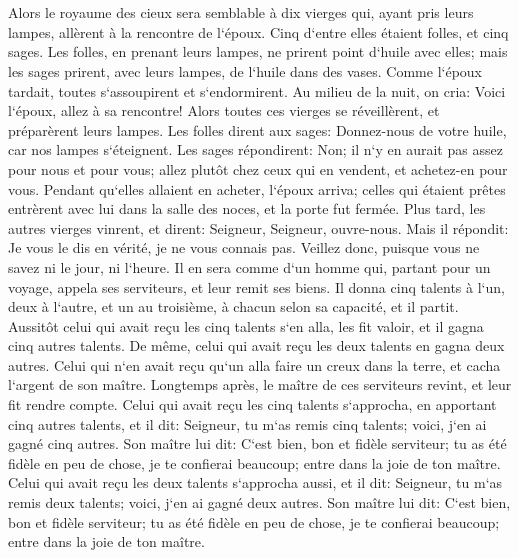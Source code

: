 \chapter{}

\verse Alors le royaume des cieux sera semblable à dix vierges qui, ayant pris leurs lampes, allèrent à la rencontre de l`époux. 
\verse Cinq d`entre elles étaient folles, et cinq sages. 
\verse Les folles, en prenant leurs lampes, ne prirent point d`huile avec elles; 
\verse mais les sages prirent, avec leurs lampes, de l`huile dans des vases. 
\verse Comme l`époux tardait, toutes s`assoupirent et s`endormirent. 
\verse Au milieu de la nuit, on cria: Voici l`époux, allez à sa rencontre! 
\verse Alors toutes ces vierges se réveillèrent, et préparèrent leurs lampes. 
\verse Les folles dirent aux sages: Donnez-nous de votre huile, car nos lampes s`éteignent. 
\verse Les sages répondirent: Non; il n`y en aurait pas assez pour nous et pour vous; allez plutôt chez ceux qui en vendent, et achetez-en pour vous. 
\verse Pendant qu`elles allaient en acheter, l`époux arriva; celles qui étaient prêtes entrèrent avec lui dans la salle des noces, et la porte fut fermée. 
\verse Plus tard, les autres vierges vinrent, et dirent: Seigneur, Seigneur, ouvre-nous. 
\verse Mais il répondit: Je vous le dis en vérité, je ne vous connais pas. 
\verse Veillez donc, puisque vous ne savez ni le jour, ni l`heure. 
\verse Il en sera comme d`un homme qui, partant pour un voyage, appela ses serviteurs, et leur remit ses biens. 
\verse Il donna cinq talents à l`un, deux à l`autre, et un au troisième, à chacun selon sa capacité, et il partit. 
\verse Aussitôt celui qui avait reçu les cinq talents s`en alla, les fit valoir, et il gagna cinq autres talents. 
\verse De même, celui qui avait reçu les deux talents en gagna deux autres. 
\verse Celui qui n`en avait reçu qu`un alla faire un creux dans la terre, et cacha l`argent de son maître. 
\verse Longtemps après, le maître de ces serviteurs revint, et leur fit rendre compte. 
\verse Celui qui avait reçu les cinq talents s`approcha, en apportant cinq autres talents, et il dit: Seigneur, tu m`as remis cinq talents; voici, j`en ai gagné cinq autres. 
\verse Son maître lui dit: C`est bien, bon et fidèle serviteur; tu as été fidèle en peu de chose, je te confierai beaucoup; entre dans la joie de ton maître. 
\verse Celui qui avait reçu les deux talents s`approcha aussi, et il dit: Seigneur, tu m`as remis deux talents; voici, j`en ai gagné deux autres. 
\verse Son maître lui dit: C`est bien, bon et fidèle serviteur; tu as été fidèle en peu de chose, je te confierai beaucoup; entre dans la joie de ton maître. 
